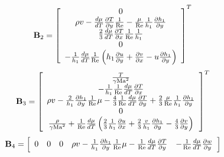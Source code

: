 \begin{equation*}
  {\bf{B}}_2  = \left[ {\begin{array}{*{20}c}
   0  \\
   {\rho v - \frac{{d\mu }}{{dT}}\frac{{\partial T}}{{\partial y}}\frac{1}{{{\mathop{\rm Re}\nolimits} }} - \frac{\mu }{{{\mathop{\rm Re}\nolimits} }}\frac{1}{{h_1 }}\frac{{\partial h_1 }}{{\partial y}}}  \\
   {\frac{2}{3}\frac{{d\mu }}{{dT}}\frac{{\partial T}}{{\partial x}}\frac{1}{{{\mathop{\rm Re}\nolimits} }}\frac{1}{{h_1 }}}  \\
   0  \\
   { - \frac{1}{{h_1 }}\frac{{d\mu }}{{dT}}\frac{1}{{{\mathop{\rm Re}\nolimits} }}\left( {h_1 \frac{{\partial u}}{{\partial y}} + \frac{{\partial v}}{{\partial x}} - u\frac{{\partial h_1 }}{{\partial y}}} \right)}  \\
\end{array}} \right]^T
\end{equation*}
\begin{equation*}
  {\bf{B}}_3  = \left[ {\begin{array}{*{20}c}
   {\frac{T}{{\gamma {\rm{Ma}}^2 }}}  \\
   { - \frac{1}{{h_1 }}\frac{1}{{{\mathop{\rm Re}\nolimits} }}\frac{{d\mu }}{{dT}}\frac{{\partial T}}{{\partial x}}}  \\
   {\rho v - \frac{2}{{h_1 }}\frac{{\partial h_1 }}{{\partial y}}\frac{1}{{{\mathop{\rm Re}\nolimits} }}\mu  - \frac{4}{3}\frac{1}{{{\mathop{\rm Re}\nolimits} }}\frac{{d\mu }}{{dT}}\frac{{\partial T}}{{\partial y}} + \frac{2}{3}\frac{\mu }{{{\mathop{\rm Re}\nolimits} }}\frac{1}{{h_1 }}\frac{{\partial h_1 }}{{\partial y}}}  \\
   0  \\
   {\frac{\rho }{{\gamma {\rm{Ma}}^2 }} + \frac{1}{{{\mathop{\rm Re}\nolimits} }}\frac{{d\mu }}{{dT}}\left( {\frac{2}{3}\frac{1}{{h_1 }}\frac{{\partial u}}{{\partial x}} + \frac{2}{3}\frac{v}{{h_1 }}\frac{{\partial h_1 }}{{\partial y}} - \frac{4}{3}\frac{{\partial v}}{{\partial y}}} \right)}  \\
\end{array}} \right]^T
\end{equation*}
\begin{equation*}
  {\bf{B}}_4  = \left[ {\begin{array}{*{20}c}
   0 & 0 & 0 & {\rho v - \frac{1}{{h_1 }}\frac{{\partial h_1 }}{{\partial y}}\frac{1}{{{\mathop{\rm Re}\nolimits} }}\mu  - \frac{1}{{{\mathop{\rm Re}\nolimits} }}\frac{{d\mu }}{{dT}}\frac{{\partial T}}{{\partial y}}} & { - \frac{1}{{{\mathop{\rm Re}\nolimits} }}\frac{{d\mu }}{{dT}}\frac{{\partial w}}{{\partial y}}}  \\
\end{array}} \right]
\end{equation*}
